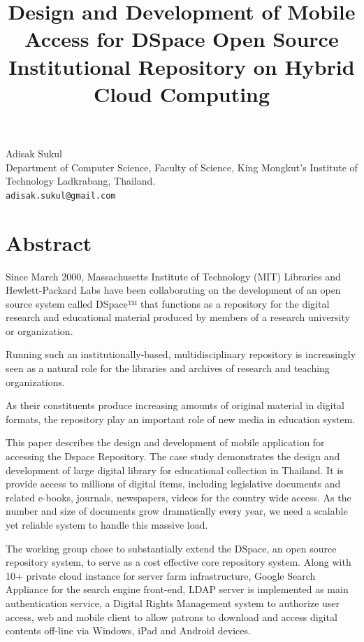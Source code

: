 \documentclass[article,A4,11pt]{llncs}%
\begin{document}
\title{Design and Development of Mobile Access for DSpace Open Source Institutional Repository on Hybrid Cloud Computing}
 \author{} \institute{}
\maketitle
\begin{center}
{\large Adisak Sukul}\\
Department of Computer Science, Faculty of Science, King Mongkut's Institute of Technology Ladkrabang, Thailand.\\
{\tt adisak.sukul@gmail.com}
\end{center}

\section*{Abstract}
Since March 2000, Massachusetts Institute of Technology (MIT) Libraries and Hewlett-Packard Labs have been collaborating on the development of an open source system called DSpace™ that functions as a repository for the digital research and educational material produced by members of a research university or organization.

Running such an institutionally-based, multidisciplinary repository is increasingly seen as a natural role for the libraries and archives of research and teaching organizations. 

As their constituents produce increasing amounts of original material in digital formats, the repository play an important role of new media in education system.

This paper describes the design and development of mobile application for accessing the Dspace Repository.
The case study demonstrates the design and development of large digital library for educational collection in Thailand. It is provide access to millions of digital items, including legislative documents and related e-books, journals, newspapers, videos for the country wide access. As the number and size of documents grow dramatically every year, we need a scalable yet reliable system to handle this massive load. 

The working group chose to substantially extend the DSpace, an open source repository system, to serve as a cost effective core repository system. Along with 10+ private cloud instance for server farm infrastructure, Google Search Appliance for the search engine front-end, LDAP server is implemented as main authentication service, a Digital Rights Management system to authorize user access, web and mobile client to allow patrons to download and access digital contents off-line via Windows, iPad and Android devices.
\end{document}
